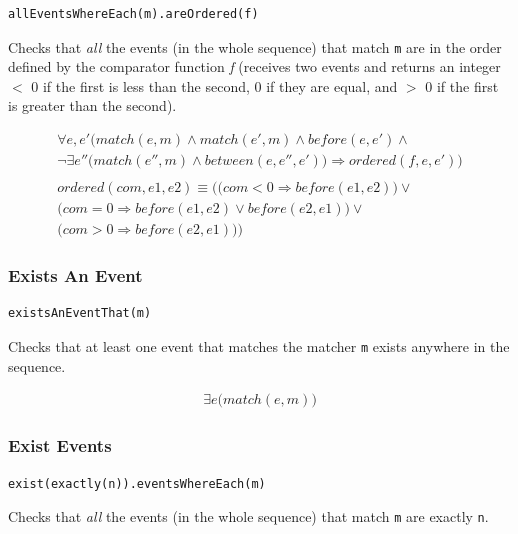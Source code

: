 \documentclass[11pt,a4paper,notitlepage]{article}
\begin{document}
\begin{lstlisting}
allEventsWhereEach(m).areOrdered(f)
\end{lstlisting}

Checks that \textit{all} the events (in the whole sequence) that match \texttt{m} are in the order defined by the comparator function \textit{f} (receives two events and returns an integer $<$ 0 if the first is less than the second, 0 if they are equal, and $>$ 0 if the first is greater than the second).

\begin{multline*}
\forall e, e' \bigg( match(e, m) \land match(e', m) \land before(e, e') \land\\ \neg \exists e'' \Big( match(e'', m) \land between(e, e'', e') \Big) \Rightarrow ordered(f, e, e') \bigg)\\\\
ordered(com, e1, e2) \equiv \bigg( \Big( com<0 \Rightarrow before(e1, e2) \Big) \lor\\ \Big( com=0 \Rightarrow before(e1, e2) \lor before(e2, e1) \Big) \lor\\ \Big( com>0 \Rightarrow before(e2, e1) \Big) \bigg)
\end{multline*}

\subsubsection{Exists An Event}

\begin{lstlisting}
existsAnEventThat(m)
\end{lstlisting}

Checks that at least one event that matches the matcher \texttt{m} exists anywhere in the sequence.

\begin{multline*}
\exists e \Big( match(e, m) \Big)
\end{multline*}

\subsubsection{Exist Events}

\begin{lstlisting}
exist(exactly(n)).eventsWhereEach(m)
\end{lstlisting}

Checks that \textit{all} the events (in the whole sequence) that match \texttt{m} are exactly \texttt{n}.
\end{document}
